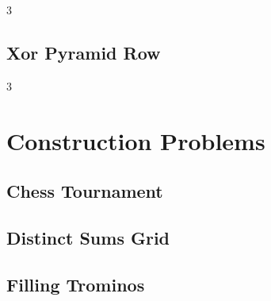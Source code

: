 \documentclass[8pt]{extarticle}
\begin{document}
\begin{multicols*}{3}
\subsection{Xor Pyramid Row}
\begin{caixaenunciado}

\end{caixaenunciado}
\vspace{0.3cm}

\end{multicols*}
\pagebreak
\begin{multicols*}{3}

\section{Construction Problems}

\subsection{Chess Tournament}
\begin{caixaenunciado}

\end{caixaenunciado}
\vspace{0.3cm}


\subsection{Distinct Sums Grid}
\begin{caixaenunciado}

\end{caixaenunciado}
\vspace{0.3cm}


\subsection{Filling Trominos}
\begin{caixaenunciado}

\end{caixaenunciado}
\vspace{0.3cm}



\end{multicols*}
\end{document}
